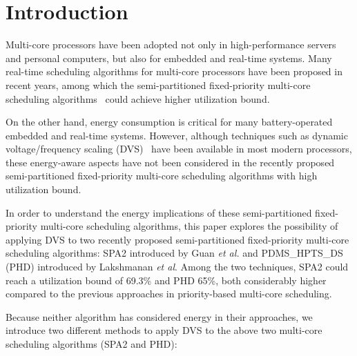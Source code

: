 \documentclass[12pt, journal,compsoc]{IEEEtran}
\begin{document}
\maketitle


\IEEEdisplaynotcompsoctitleabstractindextext



\IEEEpeerreviewmaketitle



\section{Introduction}




Multi-core processors have been adopted not only in high-performance servers and personal computers, but also for embedded and real-time systems. Many real-time scheduling algorithms for multi-core processors have been proposed in recent years, among which the semi-partitioned fixed-priority multi-core scheduling algorithms~\cite{Guan:2010:FMS:1828428.1829220,Lakshmanan:2009:PFP:1581378.1581523} could achieve higher utilization bound.

On the other hand, energy consumption is critical for many battery-operated embedded and real-time systems. However, although techniques such as dynamic voltage/frequency scaling (DVS)~\cite{WeiserWDS94} have been available in most modern processors, these energy-aware aspects have not been considered in the recently proposed semi-partitioned fixed-priority multi-core scheduling algorithms with high utilization bound.

In order to understand the energy implications of these semi-partitioned fixed-priority multi-core scheduling algorithms, this paper explores the possibility of applying DVS to two recently proposed semi-partitioned fixed-priority multi-core scheduling algorithms: SPA2 \cite{Guan:2010:FMS:1828428.1829220} introduced by Guan \emph{et al.} and PDMS\_HPTS\_DS (PHD) \cite{Lakshmanan:2009:PFP:1581378.1581523} introduced by Lakshmanan \emph{et al}. Among the two techniques, SPA2 could reach a utilization bound of 69.3\% and PHD 65\%, both considerably higher compared to the previous approaches in priority-based multi-core scheduling.

Because neither algorithm has considered energy in their approaches, we introduce two different methods to apply DVS to the above two multi-core scheduling algorithms (SPA2 and PHD):
\end{document}
